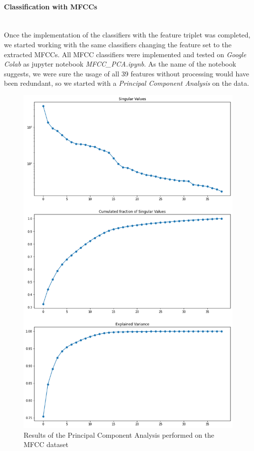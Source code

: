 \documentclass[12pt]{article}
\begin{document}
	\paragraph{Classification with MFCCs}\mbox{}\\
	Once the implementation of the classifiers with the feature triplet was completed, we started working with the same classifiers changing the feature set to the extracted MFCCs. All MFCC classifiers were implemented and tested on \textit{Google Colab} as jupyter notebook \textit{MFCC\_PCA.ipynb}. As the name of the notebook suggests, we were sure the usage of all 39 features without processing would have been redundant, so we started with a \textit{Principal Component Analysis} on the data.
	
	\begin{figure}[H]
		\hspace{70pt}\includegraphics[scale=0.44]{mfcc_pca}
		\caption{Results of the Principal Component Analysis performed on the MFCC dataset}
	\end{figure}
\end{document}
